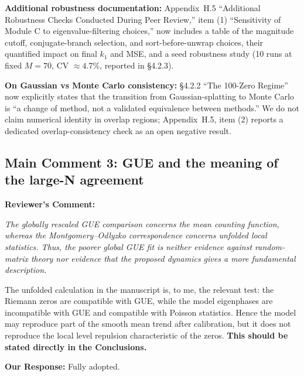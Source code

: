 \documentclass[11pt]{article}
\begin{document}
\noindent\textbf{Additional robustness documentation:} Appendix~H.5 ``Additional Robustness Checks Conducted During Peer Review,'' item (1) ``Sensitivity of Module C to eigenvalue-filtering choices,'' now includes a table of the magnitude cutoff, conjugate-branch selection, and sort-before-unwrap choices, their quantified impact on final $k_1$ and MSE, and a seed robustness study (10 runs at fixed $M=70$, CV $\approx 4.7\%$, reported in \S4.2.3).

\noindent\textbf{On Gaussian vs Monte Carlo consistency:} \S4.2.2 ``The 100-Zero Regime'' now explicitly states that the transition from Gaussian-splatting to Monte Carlo is ``a change of method, not a validated equivalence between methods.'' We do not claim numerical identity in overlap regions; Appendix~H.5, item (2) reports a dedicated overlap-consistency check as an open negative result.

\subsection*{Main Comment 3: GUE and the meaning of the large-N agreement}

\noindent\textbf{Reviewer's Comment:}
\begin{quotebox}
\itshape The globally rescaled GUE comparison concerns the mean counting function, whereas the Montgomery--Odlyzko correspondence concerns unfolded local statistics. Thus, the poorer global GUE fit is neither evidence against random-matrix theory nor evidence that the proposed dynamics gives a more fundamental description.

The unfolded calculation in the manuscript is, to me, the relevant test: the Riemann zeros are compatible with GUE, while the model eigenphases are incompatible with GUE and compatible with Poisson statistics. Hence the model may reproduce part of the smooth mean trend after calibration, but it does not reproduce the local level repulsion characteristic of the zeros. \textbf{This should be stated directly in the Conclusions.}
\end{quotebox}

\noindent\textbf{Our Response:} Fully adopted.
\end{document}
